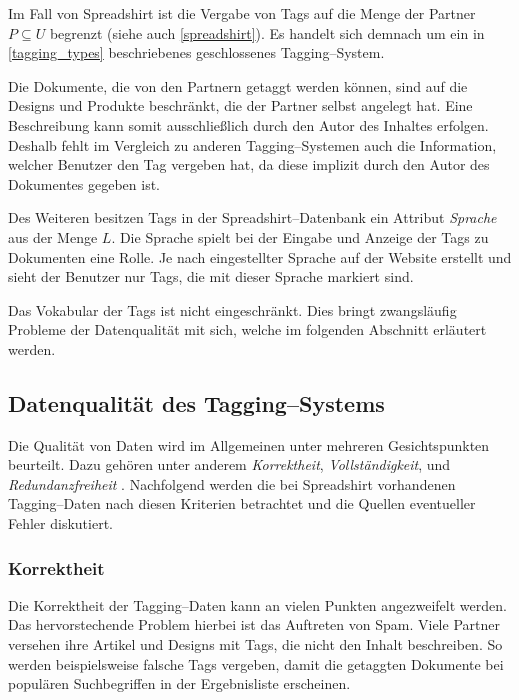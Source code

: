 Im Fall von Spreadshirt ist die Vergabe von Tags auf die Menge der Partner \(P \subseteq U\) begrenzt (siehe auch \cref{spreadshirt}). Es handelt sich demnach um ein in \cref{tagging_types} beschriebenes geschlossenes Tagging--System.

Die Dokumente, die von den Partnern getaggt werden können, sind auf die Designs und Produkte beschränkt, die der Partner selbst angelegt hat. Eine Beschreibung kann somit ausschließlich durch den Autor des Inhaltes erfolgen. Deshalb fehlt im Vergleich zu anderen Tagging--Systemen auch die Information, welcher Benutzer den Tag vergeben hat, da diese implizit durch den Autor des Dokumentes gegeben ist.

Des Weiteren besitzen Tags in der Spreadshirt--Datenbank ein Attribut \emph{Sprache} aus der Menge \(L\). Die Sprache spielt bei der Eingabe und Anzeige der Tags zu Dokumenten eine Rolle. Je nach eingestellter Sprache auf der Website erstellt und sieht der Benutzer nur Tags, die mit dieser Sprache markiert sind.

Das Vokabular der Tags ist nicht eingeschränkt. Dies bringt zwangsläufig Probleme der Datenqualität mit sich, welche im folgenden Abschnitt erläutert werden.

\subsection{Datenqualität des Tagging--Systems}
\label{quality}

Die Qualität von Daten wird im Allgemeinen unter mehreren Gesichtspunkten beurteilt. Dazu gehören unter anderem \emph{Korrektheit}, \emph{Vollständigkeit}, und \emph{Redundanzfreiheit} \cite[S. 84 f.]{hkp2012}. Nachfolgend werden die bei Spreadshirt vorhandenen Tagging--Daten nach diesen Kriterien betrachtet und die Quellen eventueller Fehler \cite[S. 43 f.]{jo2003} diskutiert.

\subsubsection{Korrektheit}

Die Korrektheit der Tagging--Daten kann an vielen Punkten angezweifelt werden. Das hervorstechende Problem hierbei ist das Auftreten von Spam. Viele Partner versehen ihre Artikel und Designs mit Tags, die nicht den Inhalt beschreiben. So werden beispielsweise falsche Tags vergeben, damit die getaggten Dokumente bei populären Suchbegriffen in der Ergebnisliste erscheinen.

